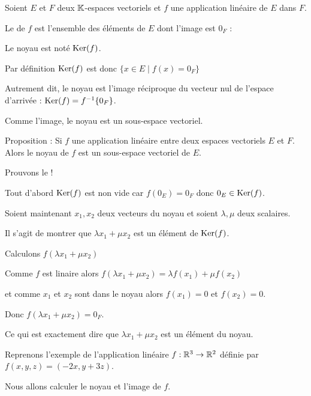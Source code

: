 Soient $E$ et $F$ deux $\mathbb{K}$-espaces vectoriels et $f$ une application linéaire de $E$ dans $F$.

Le  de $f$ est l'ensemble des 
éléments de $E$ dont l'image est $0_{F}$ :

Le noyau est noté  $\mathop{\text{Ker}}\nolimits(f)$.

Par définition $\mathop{\text{Ker}}\nolimits (f)$ est donc $\big\{x \in E \mid f(x)=0_{F}\big\}$

\change


 
 Autrement dit, le noyau est l'image réciproque du vecteur nul de l'espace d'arrivée :
 $\mathop{\text{Ker}}\nolimits(f) = f^{-1} \{0_F\}$.
 
\change

Comme l'image, le noyau est un sous-espace vectoriel.

Proposition : Si $f$ une application linéaire entre deux espaces vectoriels $E$ et $F$.
Alors le noyau de $f$ est un sous-espace vectoriel de $E$.

\change

Prouvons le !

Tout d'abord $\mathop{\text{Ker}}\nolimits(f)$ est non vide car $f(0_E)=0_F$ donc $0_{E} \in \mathop{\text{Ker}}\nolimits (f)$. 

\change

Soient maintenant $x_1,x_2$ deux vecteurs du noyau et soient $\lambda,\mu$ deux scalaires.

Il s'agit de montrer que $\lambda x_1+\mu x_2$ est un élément de $\mathop{\text{Ker}}\nolimits (f)$. 

\change

Calculons 
$f(\lambda x_1+\mu x_2)$

\change

Comme $f$ est linaire alors
$f(\lambda x_1+\mu x_2)=\lambda f(x_1)+\mu f(x_2)$

\change

et comme $x_1$ et $x_2$ sont dans le noyau alors $f(x_1)=0$ et $f(x_2)=0$.

\change

Donc $f(\lambda x_1+\mu x_2) =0_{F}.$

Ce qui est exactement dire que $\lambda x_1+\mu x_2$ est un élément du noyau.


\diapo

Reprenons l'exemple de l'application linéaire
$f : \mathbb{R}^3 \to \mathbb{R}^2$ définie par $f(x,y,z) = (-2x,y+3z)$.


\change
Nous allons calculer le noyau et l'image de $f$.



